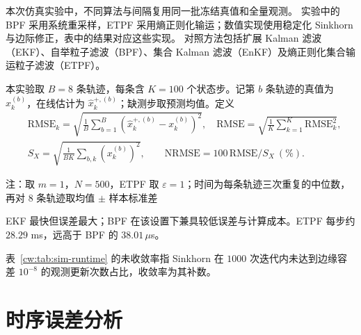 本次仿真实验中，不同算法与间隔复用同一批冻结真值和全量观测。
实验中的 BPF 采用系统重采样\cite{doucet2001sequential}，ETPF 采用熵正则化输运；数值实现使用稳定化 Sinkhorn\cite{schmitzer2019stabilized} 与边际修正\cite{altschuler2017nearlinear}，表中的结果对应这些实现。
对照方法包括扩展 Kalman 滤波（EKF）\cite{bar2001estimation}、自举粒子滤波（BPF）\cite{gordon1993novel}、集合 Kalman 滤波（EnKF）\cite{evensen2003ensemble}及熵正则化集合输运粒子滤波（ETPF）\cite{reich2013nonparametric,cuturi2013sinkhorn}。


本实验取 $B=8$ 条轨迹，每条含 $K=100$ 个状态步。记第 $b$ 条轨迹的真值为 $x_k^{(b)}$，在线估计为 $\widehat x_k^{+,(b)}$；缺测步取预测均值。定义
\begin{equation}\label{cw:eq:sim-metrics}
\begin{aligned}
&\mathrm{RMSE}_k=\sqrt{\frac1B\sum_{b=1}^{B}(\widehat x_k^{+,(b)}-x_k^{(b)})^2},\quad
\mathrm{RMSE}=\sqrt{\frac1K\sum_{k=1}^{K}\mathrm{RMSE}_k^2},\\
&S_X=\sqrt{\frac1{BK}\sum_{b,k}(x_k^{(b)})^2},\qquad
\mathrm{NRMSE}=100\,\mathrm{RMSE}/S_X\ (\%).
\end{aligned}
\end{equation}

\begin{table}[htbp]
\centering
\caption{Gordon 基准下的滤波精度与串行计算开销}
\label{cw:tab:sim-runtime}
\vspace{0.5em}\wuhao\setlength{\tabcolsep}{5pt}
%
\par\vspace{3pt}
\parbox{\wd0}{\wuhao\hspace*{\ccwd}注：取 $m=1$，$N=500$，ETPF 取 $\varepsilon=1$；时间为每条轨迹三次重复的中位数，再对 $8$ 条轨迹取均值 $\pm$ 样本标准差}
\end{table}

EKF 最快但误差最大；BPF 在该设置下兼具较低误差与计算成本。ETPF 每步约 $28.29$ ms，远高于 BPF 的 $38.01\,\mu$s。

表~\ref{cw:tab:sim-runtime} 的未收敛率指 Sinkhorn 在 $1000$ 次迭代内未达到边缘容差 $10^{-8}$ 的观测更新次数占比，收敛率为其补数。


\FloatBarrier
{}
\section{时序误差分析}
\suppressfloats[t]

